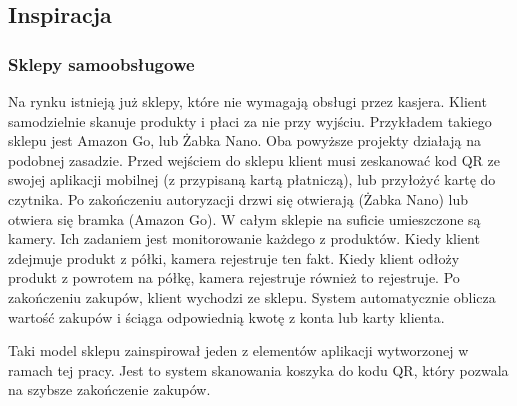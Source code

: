 \subsection{Inspiracja}

\subsubsection{Sklepy samoobsługowe}
Na rynku istnieją już sklepy, które nie wymagają obsługi przez kasjera. Klient samodzielnie skanuje produkty i płaci za nie przy wyjściu. Przykładem takiego sklepu jest Amazon Go, lub Żabka Nano. Oba powyższe projekty działają na podobnej zasadzie.
Przed wejściem do sklepu klient musi zeskanować kod QR ze swojej aplikacji mobilnej (z przypisaną kartą płatniczą), lub przyłożyć kartę do czytnika. Po zakończeniu autoryzacji drzwi się otwierają (Żabka Nano) lub otwiera się bramka (Amazon Go). W całym sklepie na suficie umieszczone są kamery.
Ich zadaniem jest monitorowanie każdego z produktów. Kiedy klient zdejmuje produkt z półki, kamera rejestruje ten fakt. Kiedy klient odłoży produkt z powrotem na półkę, kamera rejestruje również to rejestruje. Po zakończeniu zakupów, klient wychodzi ze sklepu. System automatycznie oblicza wartość zakupów i ściąga odpowiednią kwotę z konta lub karty klienta.

Taki model sklepu zainspirował jeden z elementów aplikacji wytworzonej w ramach tej pracy. Jest to system skanowania koszyka do kodu QR, który pozwala na szybsze zakończenie zakupów. 

